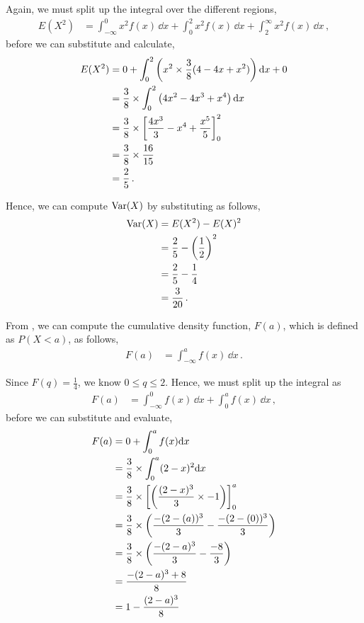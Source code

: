 \begin{subquestions}
\begin{subsubquestions}
Again, we must split up the integral over the different regions,
\begin{align}
  E(X^2) & = \int_{-\infty}^{0}x^2 f(x)\,\dd x+\int_{0}^{2}x^2 f(x)\,\dd x+\int_{2}^{\infty}x^2 f(x)\,\dd x \,,
\end{align}
before we can substitute and calculate,
\begin{align}
  E(X^2) & = 0 + \int_{0}^{2} \left(x^2 \times \frac{3}{8}(4-4x+x^2)\right)\mathrm{d}x + 0 \nonumber \\
  		 & = \frac{3}{8} \times \int_{0}^{2} \left(4x^2-4x^3+x^4\right)\mathrm{d}x  \nonumber \\
  		 & = \frac{3}{8} \times \left[ \frac{4x^3}{3} - x^4 + \frac{x^5}{5}\right]_0^2  \nonumber \\
  		 & = \frac{3}{8} \times \frac{16}{15}\nonumber \\
  		 & = \frac{2}{5}\,.
\end{align}
  
Hence, we can compute $\text{Var}(X)$ by substituting as follows,
\begin{align}
  		\text{Var}(X) & = E(X^2)- E(X)^2 \nonumber \\
         & = \frac{2}{5} - \left(\frac{1}{2}\right)^2 \nonumber \\
         & = \frac{2}{5} - \frac{1}{4} \nonumber \\
         & = \frac{3}{20} \,.
\end{align}


\subsubquestion

From , we can compute the cumulative density function, $F(a)$, which is defined as $P(X<a)$, as follows,
\begin{align}
	F(a) & = \int_{-\infty}^{a} f(x)\,\dd x \,.
\end{align}

Since $F(q) = \frac{1}{4}$, we know $0\leq q \leq 2$. Hence, we must split up the integral as
\begin{align}
	F(a) & = \int_{-\infty}^{0} f(x)\,\dd x + \int_{0}^{a} f(x)\,\dd x \,,
\end{align}
before we can substitute and evaluate,
\begin{align}
	F(a) & = 0 + \int_{0}^{a} f(x)\mathrm{d}x \nonumber \\
	     & = \frac{3}{8} \times \int_{0}^{a} (2-x)^2\mathrm{d}x \nonumber \\
	     & = \frac{3}{8} \times \left[\left(\frac{(2-x)^3}{3} \times -1 \right) \right]_0^a \nonumber \\
	     & = \frac{3}{8} \times \left(\frac{-(2-(a))^3}{3} - \frac{-(2-(0))^3}{3}\right) \nonumber \\
	     & = \frac{3}{8} \times \left(\frac{-(2-a)^3}{3} - \frac{-8}{3}\right) \nonumber \\
	     & = \frac{-(2-a)^3 + 8}{8} \nonumber \\
	     & = 1 - \frac{(2-a)^3}{8}
\end{align}


\end{subsubquestions}
\end{subquestions}

